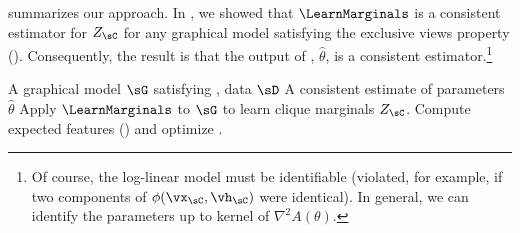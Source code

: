 
%

 summarizes our approach.
In , we showed that $\LearnMarginals$ is a consistent
estimator for $Z_\sC$ for any graphical model satisfying the exclusive views property (). 
Consequently, the result is that the output of ,
$\hat\theta$, is a consistent estimator.\footnote{Of course, the log-linear model must be identifiable
(violated, for example, if two components of $\phi(\vx_\sC, \vh_\sC)$ were identical).
In general, we can identify the parameters up to kernel of $\nabla^2 A(\theta)$.}

\renewcommand{\algorithmicrequire}{\textbf{Input:}}
\renewcommand{\algorithmicensure}{\textbf{Output:}}
\begin{algorithm}
  \caption{\LearnLogLinear}
  \label{algo:undirected}
  \begin{algorithmic}
    \REQUIRE A graphical model $\sG$ satisfying , data $\sD$
    \ENSURE A consistent estimate of parameters $\hat \theta$
      \STATE Apply $\LearnMarginals$ to $\sG$ to learn clique marginals $Z_\sC$.
      \STATE Compute expected features () and optimize .
  \end{algorithmic}
\end{algorithm}

